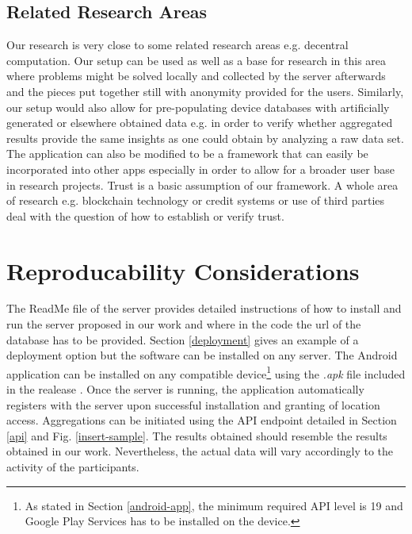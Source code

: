 \subsection{Related Research Areas}
Our research is very close to some related research areas e.g. decentral computation. Our setup can be used as well as a base for research in this area where problems might be solved locally and collected by the server afterwards and the pieces put together still with anonymity provided for the users. Similarly, our setup would also allow for pre-populating device databases with artificially generated or elsewhere obtained data e.g. in order to verify whether aggregated results provide the same insights as one could obtain by analyzing a raw data set.
The application can also be modified to be a framework that can easily be incorporated into other apps especially in order to allow for a broader user base in research projects.
Trust is a basic assumption of our framework. A whole area of research e.g. blockchain technology or credit systems or use of third parties deal with the question of how to establish or verify trust.

\section{Reproducability Considerations}
The ReadMe file of the server \parencite{readme-server} provides detailed instructions of how to install and run the server proposed in our work and where in the code the url of the database has to be provided. Section \ref{deployment} gives an example of a deployment option but the software can be installed on any server. The Android application can be installed on any compatible device\footnote{As stated in Section \ref{android-app}, the minimum required API level is 19 and Google Play Services has to be installed on the device.} using the \textit{.apk} file included in the realease \parencite{final-version-app}. Once the server is running, the application automatically registers with the server upon successful installation and granting of location access. Aggregations can be initiated using the API endpoint detailed in Section \ref{api} and Fig. \ref{insert-sample}.
The results obtained should resemble the results obtained in our work. Nevertheless, the actual data will vary accordingly to the activity of the participants.
